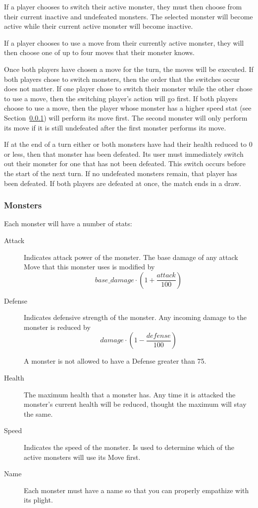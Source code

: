 \documentclass[11pt]{cselabheader}
\begin{document}
If a player chooses to switch their active monster, they must then choose from
their current inactive and undefeated monsters. The selected monster will become
active while their current active monster will become inactive.

If a player chooses to use a move from their currently active monster, they will
then choose one of up to four moves that their monster knows.

Once both players have chosen a move for the turn, the moves will be executed.
If both players chose to switch monsters, then the order that the switches occur
does not matter. If one player chose to switch their monster while the other chose
to use a move, then the switching player's action will go first. If both players
choose to use a move, then the player whose monster has a higher speed stat (see
Section~\ref{subsubsec:monster}) will perform its move first. The second monster
will only perform its move if it is still undefeated after the first monster
performs its move.

If at the end of a turn either or both monsters have had their health reduced to 0
or less, then that monster has been defeated. Its user must immediately switch out
their monster for one that has not been defeated. This switch occurs before the start
of the next turn. If no undefeated monsters remain, that player has been defeated.
If both players are defeated at once, the match ends in a draw.

\subsubsection{Monsters}
\label{subsubsec:monster}  
Each monster will have a number of stats:
\begin{description}
\item[Attack] Indicates attack power of the monster. The base damage of any
  attack Move that this monster uses is modified by $$base\_damage \cdot \left(1
  + \frac{attack}{100}\right)$$
\item[Defense] Indicates defensive strength of the monster. Any incoming damage
  to the monster is reduced by $$damage \cdot \left(1 -
  \frac{defense}{100}\right)$$

  A monster is not allowed to have a Defense greater than 75.
\item[Health] The maximum health that a monster has. Any time it is attacked the
  monster's current health will be reduced, thought the maximum will stay the
  same.
\item[Speed] Indicates the speed of the monster. Is used to determine which of
  the active monsters will use its Move first.
\item[Name] Each monster must have a name so that you can properly empathize
  with its plight.
\end{description}
\end{document}

